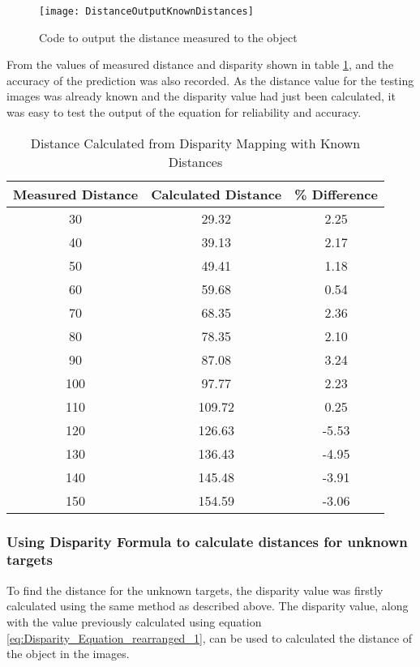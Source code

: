 \documentclass[conference]{IEEEtran}
\begin{document}
\begin{figure}[H]
\centerline{\texttt{[image: DistanceOutputKnownDistances]}}
\caption{Code to output the distance measured to the object}
\label{fig:DistanceOutputKnownDistances}
\end{figure}

From the values of measured distance and disparity shown in table \ref{table:distance_values_for_known_values}, and the accuracy of the prediction was also recorded. As the distance value for the testing images was already known and the disparity value had just been calculated, it was easy to test the output of the equation for reliability and accuracy.

\begin{table}
\begin{center}
\caption{Distance Calculated from Disparity Mapping with Known Distances}
\begin{tabular}{ || c || c || c || }
\hline
 Measured Distance & Calculated Distance & \% Difference\\ 
\hline
 30 & 29.32 & 2.25 \\  
\hline
 40 & 39.13 & 2.17 \\  
\hline
 50 & 49.41 & 1.18 \\  
\hline
 60 & 59.68 & 0.54 \\  
\hline
 70 & 68.35 & 2.36 \\  
\hline
 80 & 78.35 & 2.10 \\  
\hline
 90 & 87.08 & 3.24 \\  
\hline
 100 & 97.77 & 2.23 \\  
\hline
 110 & 109.72 & 0.25 \\  
\hline
 120 & 126.63 & -5.53 \\  
\hline
 130 & 136.43 & -4.95 \\  
\hline
 140 & 145.48 & -3.91 \\  
\hline
 150 & 154.59 & -3.06 \\  
\hline

\end{tabular}
\label{table:distance_values_for_known_values}
\end{center}
\end{table}

\subsubsection{Using Disparity Formula to calculate distances for unknown targets} 
To find the distance for the unknown targets, the disparity value was firstly calculated using the same method as described above. The disparity value, along with the value previously calculated using equation \ref{eq:Disparity_Equation_rearranged_1}, can be used to calculated the distance of the object in the images. 
\end{document}
